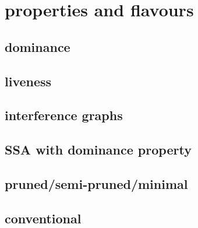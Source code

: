 \chapter*{properties and flavours}


\section{dominance}
\section{liveness}
\section{interference graphs}
\section{SSA with dominance property}
\section{pruned/semi-pruned/minimal}
\section{conventional}

